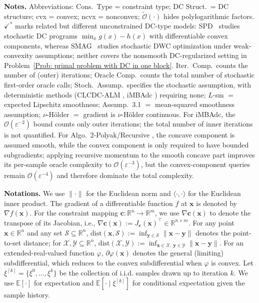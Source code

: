 \documentclass{article}
\theoremstyle{plain}
\theoremstyle{definition}
\theoremstyle{remark}
\newcommand{\RR}{\mathbb{R}}
\newcommand{\EE}{\mathbb{E}}
\newcommand{\bx}{\bm{x}}
\newcommand{\bc}{\bm{c}}
\newcommand{\by}{\bm{y}}
\newcommand{\calX}{\mathcal{X}}
\newcommand{\calY}{\mathcal{Y}}
\newcommand{\calS}{\mathcal{S}}
\newcommand{\calO}{\mathcal{O}}
\numberwithin{equation}{section}
\begin{document}
\begin{table}[t]
\begin{center}
{\begin{tabular}{lcccccc}
\end{tabular}}%
\par\vspace{1pt}
\begin{minipage}{\textwidth}
\footnotesize
\textbf{Notes.}\;
Abbreviations: Cons.~Type = constraint type; DC Struct.~= DC structure;
cvx = convex; ncvx = nonconvex; $\tilde{\calO}(\cdot)$ hides polylogarithmic factors.\;
{\(\checkmark^{*}\) marks related but different unconstrained DC-type
models: SPD~\citep{nitanda2017stochastic} studies stochastic DC programs
\(\min_x g(x)-h(x)\) with differentiable convex components, whereas
SMAG~\citep{hu2024single} studies stochastic DWC optimization under
weak-convexity assumptions; neither covers
the nonsmooth DC-regularized setting in
Problem~\eqref{Prob: primal problem with DC in one block}.}\;
Iter.~Comp.\ counts the number of (outer) iterations; Oracle Comp.\ counts the total
number of stochastic first-order oracle calls; Stoch.~Assump.\ specifies the stochastic
assumption, with deterministic methods (CLCDC-ALM \cite{sun2023algorithms}, iMBAdc \cite{liu2025convergence}) requiring none;
\(L\)-sm $=$ expected Lipschitz smoothness; Assump.~3.1 $=$ mean-squared
smoothness assumption; $\nu$-H\"older $=$ gradient is $\nu$-H\"older continuous.\;
For iMBAdc, the $\calO(\varepsilon^{-2})$ bound counts only outer iterations;
the total number of inner iterations is not quantified.\;
For Algo.~2\mbox{-}Polyak/Recursive \cite{chayti2025stochastic}, the concave component is assumed smooth,
while the convex component is only required to have bounded subgradients; applying
recursive momentum to the smooth concave part improves its per-sample oracle complexity
to $\calO(\varepsilon^{-3})$, but the convex-component queries remain
$\calO(\varepsilon^{-4})$ and therefore dominate the total complexity.
\end{minipage}
\end{center}
\vskip -0.1in
\end{table}

\noindent\textbf{Notations.}
We use $\|\cdot\|$ for the Euclidean norm and $\langle\cdot,\cdot\rangle$ for the
Euclidean inner product. The gradient of a differentiable function $f$ at $\bx$ is
denoted by $\nabla f(\bx)$. For the constraint mapping $\bc:\RR^n\to\RR^m$, we use $\nabla\bc(\bx)$ to denote the transpose of its Jacobian, i.e., $\nabla\bc(\bx):=J_{\bc}(\bx)^\top\in\RR^{n\times m}$. For any point $\bx\in\RR^n$ and any set
$\calS\subseteq\RR^n$, $\mathrm{dist}(\bx,\calS):=\inf_{\by\in\calS}\|\bx-\by\|$
denotes the point-to-set distance; for $\calX,\calY\subseteq\RR^n$,
$\mathrm{dist}(\calX,\calY):=\inf_{\bx\in\calX,\,\by\in\calY}\|\bx-\by\|$.
For an extended-real-valued function $\varphi$, $\partial \varphi(\bx)$ denotes the
general (limiting) subdifferential, which reduces to the convex subdifferential when
$\varphi$ is convex. Let $\xi^{[k]}=\{\xi^{0},\ldots,\xi^{k}\}$ be the collection of i.i.d.
samples drawn up to iteration $k$. We use $\EE[\cdot]$ for expectation and
$\EE[\cdot\mid\xi^{[k]}]$ for conditional expectation given the sample history.
\end{document}

